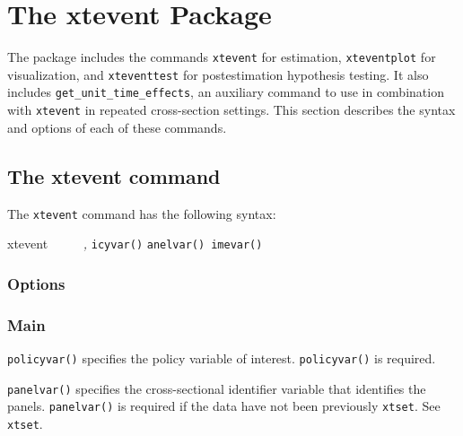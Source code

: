 \documentclass[12pt]{article}
\begin{document}



\clearpage

\appendix




\section{The xtevent Package}\label{sec:package}
The \xtevent package includes the commands \texttt{xtevent} for estimation, \texttt{xteventplot} for visualization, and \texttt{xteventtest} for postestimation hypothesis testing.
It also includes \texttt{get\_unit\_time\_effects}, an auxiliary command to use in combination with \texttt{xtevent} in repeated cross-section settings. This section describes the syntax and options of each of these commands.

\subsection{The xtevent command}
The \texttt{xtevent} command has the following syntax:

\begin{stsyntax}
	xtevent
	\depvar\
	\optindepvars\
	\optif\
	\optin\
	\optweight\
	\emph{,}
	\texttt{icyvar(\varname)}
	\texttt{anelvar(\varname)}\
	\texttt{imevar(\varname)}\
	
\end{stsyntax}

\subsubsection{Options}

\subsubsection{Main}

\hangpara
\texttt{policyvar(\varname)} specifies the policy variable of interest. \texttt{policyvar()} is required.

\hangpara
\texttt{panelvar(\varname)} specifies the cross-sectional identifier variable that identifies the panels.
\texttt{panelvar()} is required if the data have not been  previously \texttt{xtset}. See \texttt{xtset}.
\end{document}
